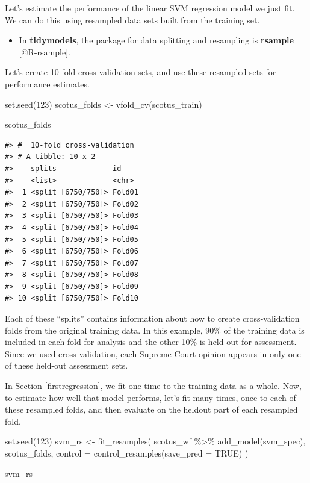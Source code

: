 \documentclass[
]{krantz}
\makeatletter
\newenvironment{Shaded}{\begin{snugshade}}{\end{snugshade}}
\newcommand{\AttributeTok}[1]{\textcolor[rgb]{0.77,0.63,0.00}{#1}}
\newcommand{\ConstantTok}[1]{\textcolor[rgb]{0.00,0.00,0.00}{#1}}
\newcommand{\DecValTok}[1]{\textcolor[rgb]{0.00,0.00,0.81}{#1}}
\newcommand{\FunctionTok}[1]{\textcolor[rgb]{0.00,0.00,0.00}{#1}}
\newcommand{\NormalTok}[1]{#1}
\newcommand{\OtherTok}[1]{\textcolor[rgb]{0.56,0.35,0.01}{#1}}
\newcommand{\SpecialCharTok}[1]{\textcolor[rgb]{0.00,0.00,0.00}{#1}}
\newenvironment{kframe}{%
\medskip{}
\setlength{\fboxsep}{.8em}
 \def\at@end@of@kframe{}%
 \ifinner\ifhmode%
  \def\at@end@of@kframe{\end{minipage}}%
  \begin{minipage}{\columnwidth}%
 \fi\fi%
 \def\FrameCommand##1{\hskip\@totalleftmargin \hskip-\fboxsep
 \colorbox{shadecolor}{##1}\hskip-\fboxsep
     \hskip-\linewidth \hskip-\@totalleftmargin \hskip\columnwidth}%
 \MakeFramed {\advance\hsize-\width
   \@totalleftmargin\z@ \linewidth\hsize
   \@setminipage}}%
 {\par\unskip\endMakeFramed%
 \at@end@of@kframe}
\renewenvironment{Shaded}{\begin{kframe}}{\end{kframe}}
\newenvironment{rmdblock}[1]
  {\begin{shaded*}
  \begin{itemize}[left = -1cm, labelsep = 1cm]
  \renewcommand{\labelitemi}{
    \raisebox{-.7\height}[0pt][0pt]{
      {\setkeys{Gin}{width=3em,keepaspectratio}\texttt{[image: images/\#1]}}
    }
  }
 
  \item
  }
  {
  \end{itemize}
  \end{shaded*}
  }
\newenvironment{rmdpackage}
  {\begin{rmdblock}{package}}
  {\end{rmdblock}}
\makeatother
\begin{document}
Let's estimate the performance of the linear SVM regression model we just fit. We can do this using resampled data sets built from the training set.

\begin{rmdpackage}
In \textbf{tidymodels}, the package for data splitting and resampling is
\textbf{rsample} {[}@R-rsample{]}.
\end{rmdpackage}

Let's create 10-fold cross-validation sets, and use these resampled sets for performance estimates.

\begin{Shaded}
\begin{Highlighting}[]
\FunctionTok{set.seed}\NormalTok{(}\DecValTok{123}\NormalTok{)}
\NormalTok{scotus\_folds }\OtherTok{\textless{}{-}} \FunctionTok{vfold\_cv}\NormalTok{(scotus\_train)}

\NormalTok{scotus\_folds}
\end{Highlighting}
\end{Shaded}

\begin{verbatim}
#> #  10-fold cross-validation 
#> # A tibble: 10 x 2
#>    splits             id    
#>    <list>             <chr> 
#>  1 <split [6750/750]> Fold01
#>  2 <split [6750/750]> Fold02
#>  3 <split [6750/750]> Fold03
#>  4 <split [6750/750]> Fold04
#>  5 <split [6750/750]> Fold05
#>  6 <split [6750/750]> Fold06
#>  7 <split [6750/750]> Fold07
#>  8 <split [6750/750]> Fold08
#>  9 <split [6750/750]> Fold09
#> 10 <split [6750/750]> Fold10
\end{verbatim}

Each of these ``splits'' contains information about how to create cross-validation folds from the original training data. In this example, 90\% of the training data is included in each fold for analysis and the other 10\% is held out for assessment. Since we used cross-validation, each Supreme Court opinion appears in only one of these held-out assessment sets.

In Section \ref{firstregression}, we fit one time to the training data as a whole. Now, to estimate how well that model performs, let's fit many times, once to each of these resampled folds, and then evaluate on the heldout part of each resampled fold.

\begin{Shaded}
\begin{Highlighting}[]
\FunctionTok{set.seed}\NormalTok{(}\DecValTok{123}\NormalTok{)}
\NormalTok{svm\_rs }\OtherTok{\textless{}{-}} \FunctionTok{fit\_resamples}\NormalTok{(}
\NormalTok{  scotus\_wf }\SpecialCharTok{\%\textgreater{}\%} \FunctionTok{add\_model}\NormalTok{(svm\_spec),}
\NormalTok{  scotus\_folds,}
  \AttributeTok{control =} \FunctionTok{control\_resamples}\NormalTok{(}\AttributeTok{save\_pred =} \ConstantTok{TRUE}\NormalTok{)}
\NormalTok{)}

\NormalTok{svm\_rs}
\end{Highlighting}
\end{Shaded}
\end{document}

